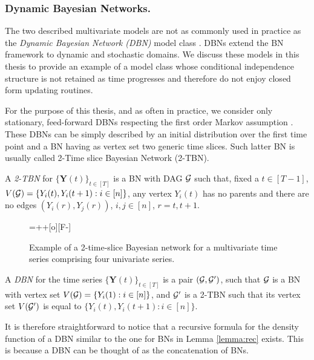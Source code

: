 \subsubsection{Dynamic Bayesian Networks.}
The two described multivariate models are not as commonly used in practice as the \textit{Dynamic Bayesian Network (DBN)} model class \citep{Murphy2002}. DBNs extend the BN framework to dynamic and stochastic domains. We discuss these models in this thesis to provide an example of a model class whose conditional independence structure is not retained as time progresses and therefore do not enjoy closed form updating routines.

 For the purpose of this thesis, and as often in practice, we consider only stationary, feed-forward DBNs respecting the first order Markov assumption \citep[see e.g.][]{Oates2013}. These DBNs can be simply described by an initial distribution over the first time point and a BN having as vertex set two generic time slices. Such latter BN is usually called 2-Time slice Bayesian Network (2-TBN).

\begin{definition}
\label{def:2-TBN}
A \emph{2-TBN} for $\{\bm{Y}(t)\}_{t\in[T]}$ is a BN with DAG $\mathcal{G}$ such that, fixed a  $t\in [T-1]$, $V(\mathcal{G})=\{Y_i(t),Y_{i}(t+1):i\in[n]\}$, any vertex $Y_i(t)$ has no parents and there are no edges $(Y_{i}(r),Y_{j}(r))$, $i,j\in[n]$, $r=t,t+1$.   
\end{definition} 
    
\begin{figure}
\vspace{-.3cm}
\centerline{
\entrymodifiers={++[o][F-]}
}
\caption{Example of a 2-time-slice Bayesian network for a multivariate time series comprising four univariate series. \label{fig:2-TBN}}
\end{figure}

\begin{definition}
A \emph{DBN} for the time series $\{\bm{Y}(t)\}_{t\in[T]}$ is a pair $(\mathcal{G},\mathcal{G}')$, such that $\mathcal{G}$ is a BN with vertex set $V(\mathcal{G})=\{Y_i(1):i\in[n]\}$, and $\mathcal{G}'$ is a 2-TBN such that its  vertex set $V(\mathcal{G}')$ is equal to $\{Y_i(t),Y_{i}(t+1):i\in[n]\}$.
\end{definition}

It is therefore straightforward to notice that a recursive formula for the density function of a DBN similar to the one for BNs in Lemma \ref{lemma:rec} exists. This is because a DBN can be thought of as the concatenation of BNs.

